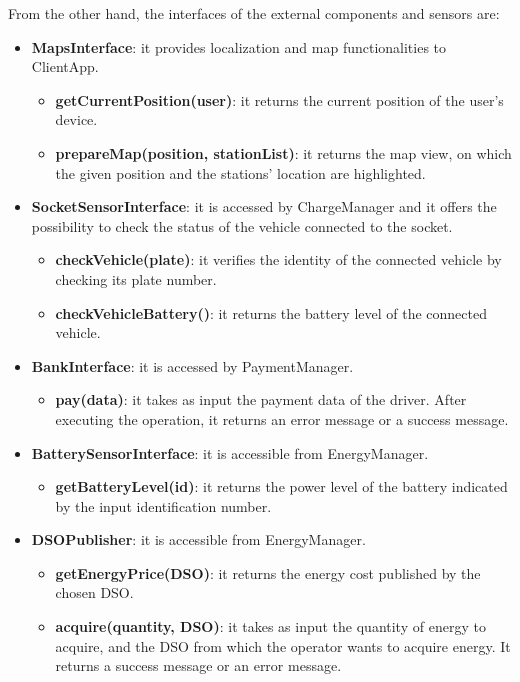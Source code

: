 \documentclass[../main.tex]{subfiles}
\begin{document}
\noindent
From the other hand, the interfaces of the external components and sensors are:
\begin{itemize}
    \item \textbf{MapsInterface}: it provides localization and map functionalities to ClientApp.
    \begin{itemize}
        \item \textbf{getCurrentPosition(user)}: it returns the current position of the user's device. 
        \item \textbf{prepareMap(position, stationList)}: it returns the map view, on which the given position and the stations' location are highlighted.
    \end{itemize}

    \item \textbf{SocketSensorInterface}: it is accessed by ChargeManager and it offers the possibility to check the status of the vehicle connected to the socket.
    \begin{itemize}
        \item \textbf{checkVehicle(plate)}: it verifies the identity of the connected vehicle by checking its plate number.
        \item \textbf{checkVehicleBattery()}: it returns the battery level of the connected vehicle.
    \end{itemize}

    \item \textbf{BankInterface}: it is accessed by PaymentManager.
    \begin{itemize}
        \item \textbf{pay(data)}: it takes as input the payment data of the driver. After executing the operation, it returns an error message or a success message.
    \end{itemize}

    \item \textbf{BatterySensorInterface}: it is accessible from EnergyManager.
    \begin{itemize}
        \item \textbf{getBatteryLevel(id)}: it returns the power level of the battery indicated by the input identification number. 
    \end{itemize}

    \item \textbf{DSOPublisher}: it is accessible from EnergyManager.
    \begin{itemize}
        \item \textbf{getEnergyPrice(DSO)}: it returns the energy cost published by the chosen DSO. 
        \item \textbf{acquire(quantity, DSO)}: it takes as input the quantity of energy to acquire, and the DSO from which the operator wants to acquire energy. It returns a success message or an error message.
    \end{itemize}


\end{itemize}
\end{document}
